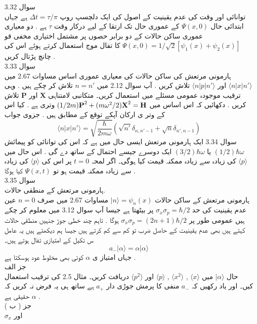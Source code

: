 \documentclass{book}
\begin{document}
سوال 
3.32\\
توانائی اور وقت کی عدم یقینیت کے اصول کی ایک دلچسپ روپ
\(\Delta t=\tau/\pi\)
ہے جہاں ابتدائی حال
\(\Psi (x,0)\)
کے عموری حال تک ارتقا کے لیے درکار وقت
\(\tau\)
ہے . دو معیاری عموری ساکن حالات کے دو برابر حصوں پر مشتمل اختیاری مخفی قو
\(\Psi(x,0)=1/\sqrt{2}[\psi_{1}(x)+\psi_{2}(x)]\)
کا تفال موج استعمال کرتے ہوئے اس کی چانچ پڑتال کریں .\\
سوال 
3.33\\
ہارمونی مرتعش کی ساکن حالات کی معیاری عموری اساس مساوات 2.67
میں
\(\langle n|x|n'\rangle\)
اور
\(\langle n|p|n'\rangle\)
تلاش کریں . آپ سوال 2.12 میں
\(n=n'\)
تلاش کر چکے ہیں . وہی ترقیب موجودہ عمومی مسئلے میں استعمال کریں۔ متکانبی لامتناہی
\(\textbf{X}\)
اور
\(\textbf{P}\)
تلاش کریں . دکھائیں کہ اس اساس میں
\((1/2m)\text{\textbf{P}}^{2}+(m\omega^{2}/2)\text{\textbf{X}}^{2}=\text{\textbf{H}}\)
وتری ہے . کیا اس کے وتر ی ارکان آپکے توقع کے مطابق ہیں .
جزوی جواب
\[\langle n|x|n'\rangle=\sqrt{\frac{\hbar}{2m\omega}}(\sqrt{n'}\delta_{n,n'-1}+\sqrt{n}\delta_{n',n-1})\]
سوال 3.34
ایک ہارمونی مرتعش ایسی حال میں ہے کہ اس کی توانائی کو پیمائش
\((1/2)\hbar\omega\)
یا
\((3/2)\hbar\omega\)
ایک دوسرے جیسے احتمال کے ساتھ دے گی . اس حال میں
\(\langle p\rangle\)
کی زیادہ سے زیادہ ممکنہ قیمت کیا ہوگی۔ اگر لمحہ
\(t=0\)
پر اس کی
\(\langle p\rangle\)
کی زیادہ سے زیادہ ممکنہ قیمت ہو تو
\(\Psi(x,t)\)
کیا ہوگا .\\
سوال 
3.35\\
ہارمونی مرتعش کے منطقی حالات. \\
ہارمونی مرتعش کے ساکن حالات 
\(|n\rangle =\psi_{n}(x)\)
مساوات 2.67 میں صرف
\(n=0\)
عین عدم یقینیت کی حد
\(\sigma_{x}\sigma_{p}=\hbar/2\)
پر بیٹھتا ہے جیسا آپ سوال 3.12 میں معلوم کر چکے ہیں عمومی طور پر
\(\sigma_{x}\sigma_{p}=(2n+1)\hbar/2\)
ہوگا . تاہم چند خطی جوڑ جنہیں منطقی حالات کہتے ہیں بھی عدم یقینیت کے حاصل ضرب تو کم سے کم کرتے ہیں جیسا ہم دیکھتے ہیں یہ عامل س تکیل کے امتیازی تفال ہوتے ہیں۔\\
\[a_{-}|\alpha\rangle =\alpha|\alpha\rangle\]
جہاں امتیاز ی 
\(\alpha\)
کوئی بھی مخلوط عود ہوسکتا ہے .\\
جز الف\\
حال 
\(|\alpha\rangle\)
میں
\(\langle x \rangle\)
,
\(\langle x^{2} \rangle\)
,
\(\langle p \rangle\)
اور
\(\langle p^{2} \rangle\)
دریافت کریں۔ مثال 2.5 کی ترقیب استعمال کیں۔ اور یاد رکھیں کہ
\(a_{-}\)
منفی کا پرمش جوڑی دار
\(a_{+}\)
ہے ساتھ ہی یہ فرض نہ کریں کہ
\(\alpha\)
حقیقی ہے .\\
جز ( ب )\\
\(\sigma_{x}\)
اور
\end{document}
